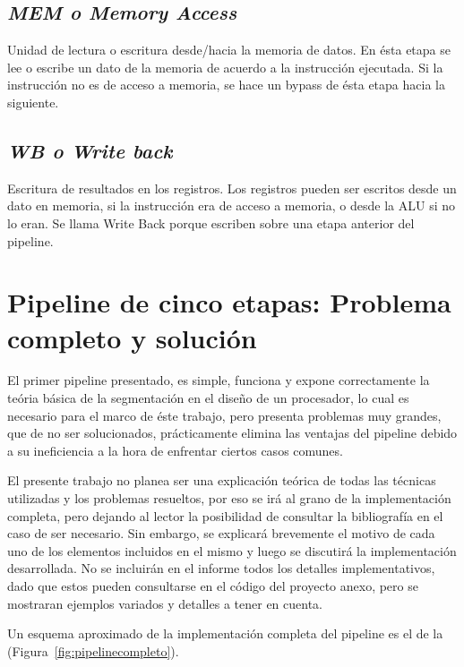 \documentclass[12pt]{article}
\begin{document}
\subsection{\textit{MEM o Memory Access}}
Unidad de lectura o escritura desde/hacia la memoria de datos. En ésta etapa se lee o escribe un dato de la memoria de acuerdo a la instrucción ejecutada. Si la instrucción no es de acceso a memoria, se hace un bypass de ésta etapa hacia la siguiente.

\subsection{\textit{WB o Write back}}
Escritura de resultados en los registros. Los registros pueden ser escritos desde un dato en memoria, si la instrucción era de acceso a memoria, o desde la ALU si no lo eran. Se llama Write Back porque escriben sobre una etapa anterior del pipeline.

\section{Pipeline de cinco etapas: Problema completo y solución}

El primer pipeline presentado, es simple, funciona y expone correctamente la teória básica de la segmentación en el diseño de un procesador, lo cual es necesario para el marco de éste trabajo, pero presenta problemas muy grandes, que de no ser solucionados, prácticamente elimina las ventajas del pipeline debido a su ineficiencia a la hora de enfrentar ciertos casos comunes.

El presente trabajo no planea ser una explicación teórica de todas las técnicas utilizadas y los problemas resueltos, por eso se irá al grano de la implementación completa, pero dejando al lector la posibilidad de consultar la bibliografía en el caso de ser necesario. Sin embargo, se explicará brevemente el motivo de cada uno de los elementos incluidos en el mismo y luego se discutirá la implementación desarrollada. No se incluirán en el informe todos los detalles implementativos, dado que estos pueden consultarse en el código del proyecto anexo, pero se mostraran ejemplos variados y detalles a tener en cuenta.

Un esquema aproximado de la implementación completa del pipeline es el de la (Figura~\ref{fig:pipelinecompleto}).
\end{document}
